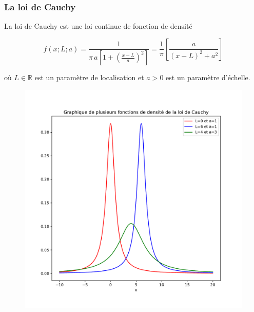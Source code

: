 \documentclass[8pt, sans]{beamer}
\begin{document}
\begin{frame}
\frametitle{La loi de Cauchy}
La loi de Cauchy est une loi continue de fonction de densité 

$$f(x;L;a)=\frac{1}{\pi\,a\left[1+\left(\frac{x-L}{a}\right)^2\right]}=\frac{1}{\pi}\left[\frac{a}{(x-L)^2+a^2}\right]$$

où $L\in\mathbb{R}$ est un paramètre de localisation et $a>0$ est un paramètre d'échelle.

\pause

\begin{figure}[H]
\begin{center}
\includegraphics[scale=0.3]{graphiques_Cauchy.pdf}
\end{center}
\end{figure}

\end{frame}
\end{document}
